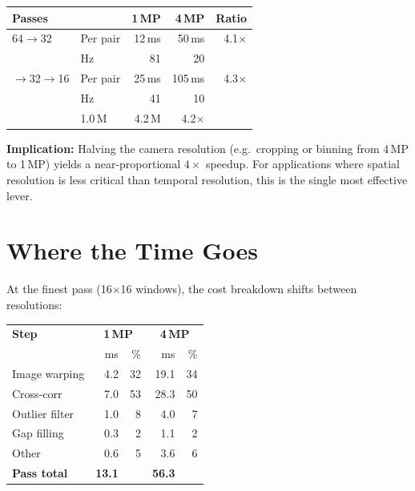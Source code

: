 \documentclass[10pt,a4paper,twocolumn]{article}
\begin{document}
\begin{center}
\small
\begin{tabular}{@{}llrrr@{}}
\toprule
\textbf{Passes} & & \textbf{1\,MP} & \textbf{4\,MP} & \textbf{Ratio} \\
\midrule
64$\to$32       & Per pair & 12\,ms & 50\,ms & 4.1$\times$ \\
                & Hz       & 81     & 20     & \\
\addlinespace[2pt]
64$\to$32$\to$16 & Per pair & 25\,ms & 105\,ms & 4.3$\times$ \\
                  & Hz       & 41     & 10     & \\
\addlinespace[2pt]
\multicolumn{2}{@{}l}{Pixel ratio} & 1.0\,M & 4.2\,M & 4.2$\times$ \\
\bottomrule
\end{tabular}
\end{center}

\textbf{Implication:} Halving the camera resolution (e.g.\ cropping or binning from 4\,MP to 1\,MP) yields a near-proportional $4\times$ speedup. For applications where spatial resolution is less critical than temporal resolution, this is the single most effective lever.

\section{Where the Time Goes}

At the finest pass (16$\times$16 windows), the cost breakdown shifts between resolutions:

\begin{center}
\small
\begin{tabular}{@{}lrrrr@{}}
\toprule
\textbf{Step} & \multicolumn{2}{c}{\textbf{1\,MP}} & \multicolumn{2}{c}{\textbf{4\,MP}} \\
              & ms & \% & ms & \% \\
\midrule
Image warping  & 4.2  & 32 & 19.1 & 34 \\
Cross-corr     & 7.0  & 53 & 28.3 & 50 \\
Outlier filter & 1.0  & 8  & 4.0  & 7  \\
Gap filling    & 0.3  & 2  & 1.1  & 2  \\
Other          & 0.6  & 5  & 3.6  & 6  \\
\midrule
\textbf{Pass total} & \textbf{13.1} & & \textbf{56.3} & \\
\bottomrule
\end{tabular}
\end{center}
\end{document}
